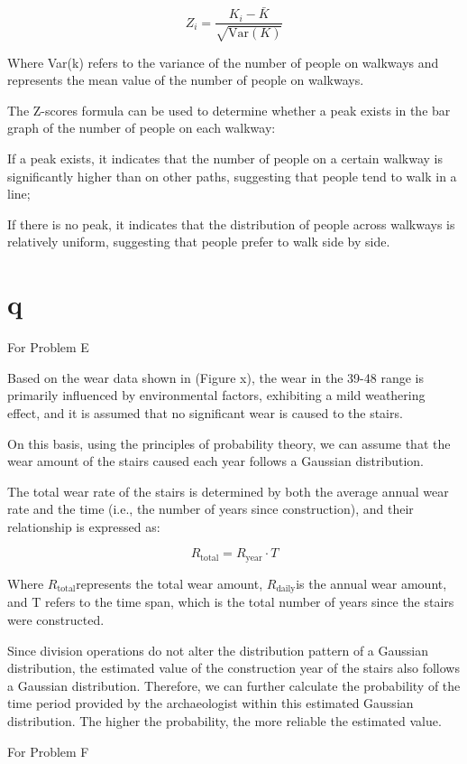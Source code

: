 \documentclass{mcmthesis}
\begin{document}
\[ Z_i = \frac{K_i - \bar{K}}{\sqrt{\text{Var}(K)}} \]

Where Var(k) refers to the variance of the number of people on walkways and represents the mean value of the number of people on walkways.

The Z-scores formula can be used to determine whether a peak exists in the bar graph of the number of people on each walkway:

If a peak exists, it indicates that the number of people on a certain walkway is significantly higher than on other paths, suggesting that people tend to walk in a line;

If there is no peak, it indicates that the distribution of people across walkways is relatively uniform, suggesting that people prefer to walk side by side.

\section{q}
For Problem E

Based on the wear data shown in (Figure x), the wear in the 39-48 range is primarily influenced by environmental factors, exhibiting a mild weathering effect, and it is assumed that no significant wear is caused to the stairs.

On this basis, using the principles of probability theory, we can assume that the wear amount of the stairs caused each year follows a Gaussian distribution.

The total wear rate of the stairs is determined by both the average annual wear rate and the time (i.e., the number of years since construction), and their relationship is expressed as:

\[R_{\text{total}} = R_{\text{year}} \cdot T \]

Where $R_{\text{total}}$​ represents the total wear amount, $R_{\text{daily}}$​ is the annual wear amount, and T refers to the time span, which is the total number of years since the stairs were constructed.

Since division operations do not alter the distribution pattern of a Gaussian distribution, the estimated value of the construction year of the stairs also follows a Gaussian distribution. Therefore, we can further calculate the probability of the time period provided by the archaeologist within this estimated Gaussian distribution. The higher the probability, the more reliable the estimated value.

For Problem F
\end{document}
